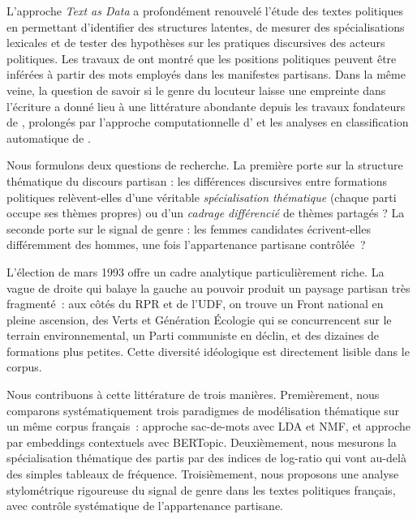 \documentclass{article}
\begin{document}
L'approche \emph{Text as Data} \citep{grimmer2013text} a profondément renouvelé
l'étude des textes politiques en permettant d'identifier des structures latentes,
de mesurer des spécialisations lexicales et de tester des hypothèses sur les
pratiques discursives des acteurs politiques. Les travaux de \citet{laver2003extracting}
ont montré que les positions politiques peuvent être inférées à partir des mots
employés dans les manifestes partisans. Dans la même veine, la question de savoir
si le genre du locuteur laisse une empreinte dans l'écriture a donné lieu à
une littérature abondante depuis les travaux fondateurs de \citet{lakoff1975language},
prolongés par l'approche computationnelle d'\citet{argamon2003gender} et les
analyses en classification automatique de \citet{koppel2002automatically}.

Nous formulons deux questions de recherche. La première porte sur la structure
thématique du discours partisan : les différences discursives entre formations
politiques relèvent-elles d'une véritable \emph{spécialisation thématique}
(chaque parti occupe ses thèmes propres) ou d'un \emph{cadrage différencié}
de thèmes partagés ? La seconde porte sur le signal de genre : les femmes
candidates écrivent-elles différemment des hommes, une fois l'appartenance
partisane contrôlée~?

L'élection de mars 1993 offre un cadre analytique particulièrement riche.
La vague de droite qui balaye la gauche au pouvoir produit un paysage partisan
très fragmenté~: aux côtés du RPR et de l'UDF, on trouve un Front national
en pleine ascension, des Verts et Génération Écologie qui se concurrencent
sur le terrain environnemental, un Parti communiste en déclin, et des dizaines
de formations plus petites. Cette diversité idéologique est directement lisible
dans le corpus.

Nous contribuons à cette littérature de trois manières. Premièrement, nous
comparons systématiquement trois paradigmes de modélisation thématique sur un
même corpus français~: approche sac-de-mots avec LDA et NMF,
et approche par embeddings contextuels avec BERTopic. Deuxièmement, nous
mesurons la spécialisation thématique des partis par des indices de log-ratio
qui vont au-delà des simples tableaux de fréquence. Troisièmement, nous
proposons une analyse stylométrique rigoureuse du signal de genre dans les
textes politiques français, avec contrôle systématique de l'appartenance partisane.

\end{document}
